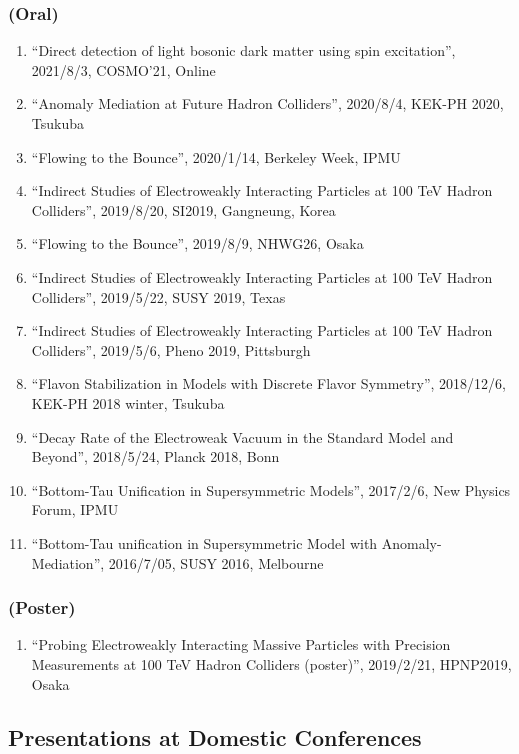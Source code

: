 \documentclass[12pt]{article}
\begin{document}
\subsubsection*{(Oral)}
\begin{enumerate}
 \item ``Direct detection of light bosonic dark matter using spin excitation'', 2021/8/3, COSMO'21, Online
 \item ``Anomaly Mediation at Future Hadron Colliders'', 2020/8/4, KEK-PH 2020, Tsukuba
 \item ``Flowing to the Bounce'', 2020/1/14, Berkeley Week, IPMU
 \item ``Indirect Studies of Electroweakly Interacting Particles at 100 TeV Hadron Colliders'', 2019/8/20, SI2019, Gangneung, Korea
 \item ``Flowing to the Bounce'', 2019/8/9, NHWG26, Osaka
 \item ``Indirect Studies of Electroweakly Interacting Particles at 100 TeV Hadron Colliders'', 2019/5/22, SUSY 2019, Texas
 \item ``Indirect Studies of Electroweakly Interacting Particles at 100 TeV Hadron Colliders'', 2019/5/6, Pheno 2019, Pittsburgh
 \item ``Flavon Stabilization in Models with Discrete Flavor Symmetry'', 2018/12/6, KEK-PH 2018 winter, Tsukuba
 \item ``Decay Rate of the Electroweak Vacuum in the Standard Model and Beyond'', 2018/5/24, Planck 2018, Bonn
 \item ``Bottom-Tau Unification in Supersymmetric Models'', 2017/2/6, New Physics Forum, IPMU
 \item ``Bottom-Tau unification in Supersymmetric Model with Anomaly-Mediation'', 2016/7/05, SUSY 2016, Melbourne
\end{enumerate}
\subsubsection*{(Poster)}
\begin{enumerate}
 \item ``Probing Electroweakly Interacting Massive Particles with Precision Measurements at 100 TeV Hadron Colliders (poster)'', 2019/2/21, HPNP2019, Osaka
\end{enumerate}

\subsection*{Presentations at Domestic Conferences}
\end{document}
